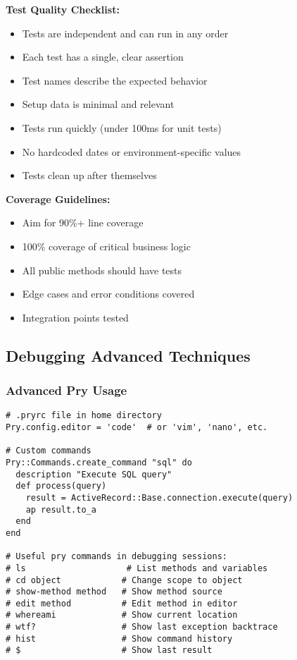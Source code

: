 \documentclass[12pt,a4paper]{article}
\begin{document}
\textbf{Test Quality Checklist:}
\begin{itemize}
    \item Tests are independent and can run in any order
    \item Each test has a single, clear assertion
    \item Test names describe the expected behavior
    \item Setup data is minimal and relevant
    \item Tests run quickly (under 100ms for unit tests)
    \item No hardcoded dates or environment-specific values
    \item Tests clean up after themselves
\end{itemize}

\textbf{Coverage Guidelines:}
\begin{itemize}
    \item Aim for 90\%+ line coverage
    \item 100\% coverage of critical business logic
    \item All public methods should have tests
    \item Edge cases and error conditions covered
    \item Integration points tested
\end{itemize}

\subsection{Debugging Advanced Techniques}

\subsubsection{Advanced Pry Usage}

\begin{lstlisting}
# .pryrc file in home directory
Pry.config.editor = 'code'  # or 'vim', 'nano', etc.

# Custom commands
Pry::Commands.create_command "sql" do
  description "Execute SQL query"
  def process(query)
    result = ActiveRecord::Base.connection.execute(query)
    ap result.to_a
  end
end

# Useful pry commands in debugging sessions:
# ls                    # List methods and variables
# cd object            # Change scope to object
# show-method method   # Show method source
# edit method          # Edit method in editor
# whereami             # Show current location
# wtf?                 # Show last exception backtrace
# hist                 # Show command history
# $                    # Show last result
\end{lstlisting}
\end{document}
